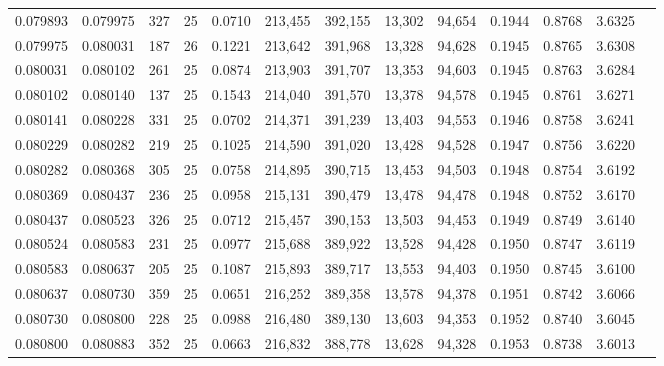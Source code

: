 \begin{tabular}{rrrrrrrrrrrrr}
0.079893 & 0.079975 &   327 &  25 &                                     0.0710 & 213,455 & 392,155 &  13,302 &  94,654 & 0.1944 & 0.8768 & 3.6325 \\
0.079975 & 0.080031 &   187 &  26 &                                     0.1221 & 213,642 & 391,968 &  13,328 &  94,628 & 0.1945 & 0.8765 & 3.6308 \\
0.080031 & 0.080102 &   261 &  25 &                                     0.0874 & 213,903 & 391,707 &  13,353 &  94,603 & 0.1945 & 0.8763 & 3.6284 \\
0.080102 & 0.080140 &   137 &  25 &                                     0.1543 & 214,040 & 391,570 &  13,378 &  94,578 & 0.1945 & 0.8761 & 3.6271 \\
0.080141 & 0.080228 &   331 &  25 &                                     0.0702 & 214,371 & 391,239 &  13,403 &  94,553 & 0.1946 & 0.8758 & 3.6241 \\
0.080229 & 0.080282 &   219 &  25 &                                     0.1025 & 214,590 & 391,020 &  13,428 &  94,528 & 0.1947 & 0.8756 & 3.6220 \\
0.080282 & 0.080368 &   305 &  25 &                                     0.0758 & 214,895 & 390,715 &  13,453 &  94,503 & 0.1948 & 0.8754 & 3.6192 \\
0.080369 & 0.080437 &   236 &  25 &                                     0.0958 & 215,131 & 390,479 &  13,478 &  94,478 & 0.1948 & 0.8752 & 3.6170 \\
0.080437 & 0.080523 &   326 &  25 &                                     0.0712 & 215,457 & 390,153 &  13,503 &  94,453 & 0.1949 & 0.8749 & 3.6140 \\
0.080524 & 0.080583 &   231 &  25 &                                     0.0977 & 215,688 & 389,922 &  13,528 &  94,428 & 0.1950 & 0.8747 & 3.6119 \\
0.080583 & 0.080637 &   205 &  25 &                                     0.1087 & 215,893 & 389,717 &  13,553 &  94,403 & 0.1950 & 0.8745 & 3.6100 \\
0.080637 & 0.080730 &   359 &  25 &                                     0.0651 & 216,252 & 389,358 &  13,578 &  94,378 & 0.1951 & 0.8742 & 3.6066 \\
0.080730 & 0.080800 &   228 &  25 &                                     0.0988 & 216,480 & 389,130 &  13,603 &  94,353 & 0.1952 & 0.8740 & 3.6045 \\
0.080800 & 0.080883 &   352 &  25 &                                     0.0663 & 216,832 & 388,778 &  13,628 &  94,328 & 0.1953 & 0.8738 & 3.6013 \\

\end{tabular}
